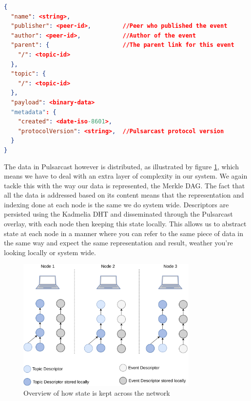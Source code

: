 \noindent\begin{minipage}{\textwidth}
\vspace{8pt}
\begin{lstlisting}[language=JSON,caption={Event descriptor schema in a JSON based format},label={event-descriptor},captionpos=b]
{
  "name": <string>,
  "publisher": <peer-id>,         //Peer who published the event
  "author": <peer-id>,            //Author of the event
  "parent": {                     //The parent link for this event
    "/": <topic-id>
  },
  "topic": {
    "/": <topic-id>
  },
  "payload": <binary-data>
  "metadata": {
    "created": <date-iso-8601>,
    "protocolVersion": <string>,  //Pulsarcast protocol version
  }
}
\end{lstlisting}
\vspace{8pt}
\end{minipage}

The data in Pulsarcast however is distributed, as illustrated by figure \ref{fig:pulsarcast-local-vs-distributed-state}, which means we have to deal with
an extra layer of complexity in our system. We again tackle this with the way
our data is represented, the Merkle DAG. The fact that all the data is
addressed based on its content means that the representation and indexing done
at each node is the same we do system wide. Descriptors are persisted using the
Kadmelia DHT and disseminated through the Pulsarcast overlay, with each node
then keeping this state locally. This allows us to abstract state at each node
in a manner where you can refer to the same piece of data in the same way and
expect the same representation and result, weather you're looking locally or
system wide.

\begin{figure}[hb!]
  \centering
  \includegraphics[width=0.8\textwidth]{img/pulsarcast-local-vs-distributed-state.png}
  \caption{Overview of how state is kept across the network}
  \label{fig:pulsarcast-local-vs-distributed-state}
\end{figure}

